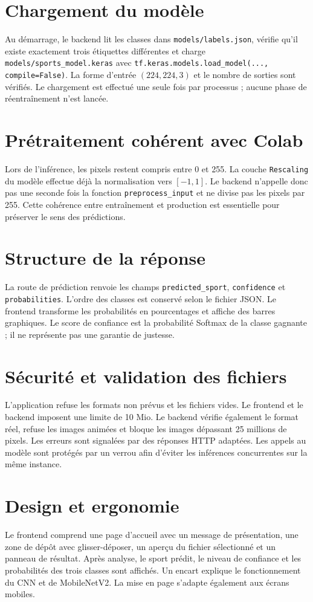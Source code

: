 \documentclass[11pt,a4paper,oneside]{report}
\begin{document}
\section{Chargement du modèle}
Au démarrage, le backend lit les classes dans \texttt{models/labels.json}, vérifie qu'il existe exactement trois étiquettes différentes et charge \texttt{models/sports\_model.keras} avec \texttt{tf.keras.models.load\_model(..., compile=False)}. La forme d'entrée $(224,224,3)$ et le nombre de sorties sont vérifiés. Le chargement est effectué une seule fois par processus ; aucune phase de réentraînement n'est lancée.
\section{Prétraitement cohérent avec Colab}
Lors de l'inférence, les pixels restent compris entre 0 et 255. La couche \texttt{Rescaling} du modèle effectue déjà la normalisation vers $[-1,1]$. Le backend n'appelle donc pas une seconde fois la fonction \texttt{preprocess\_input} et ne divise pas les pixels par 255. Cette cohérence entre entraînement et production est essentielle pour préserver le sens des prédictions.
\section{Structure de la réponse}
La route de prédiction renvoie les champs \texttt{predicted\_sport}, \texttt{confidence} et \texttt{probabilities}. L'ordre des classes est conservé selon le fichier JSON. Le frontend transforme les probabilités en pourcentages et affiche des barres graphiques. Le score de confiance est la probabilité Softmax de la classe gagnante ; il ne représente pas une garantie de justesse.
\section{Sécurité et validation des fichiers}
L'application refuse les formats non prévus et les fichiers vides. Le frontend et le backend imposent une limite de 10 Mio. Le backend vérifie également le format réel, refuse les images animées et bloque les images dépassant 25 millions de pixels. Les erreurs sont signalées par des réponses HTTP adaptées. Les appels au modèle sont protégés par un verrou afin d'éviter les inférences concurrentes sur la même instance.
\section{Design et ergonomie}
Le frontend comprend une page d'accueil avec un message de présentation, une zone de dépôt avec glisser-déposer, un aperçu du fichier sélectionné et un panneau de résultat. Après analyse, le sport prédit, le niveau de confiance et les probabilités des trois classes sont affichés. Un encart explique le fonctionnement du CNN et de MobileNetV2. La mise en page s'adapte également aux écrans mobiles.
\end{document}
